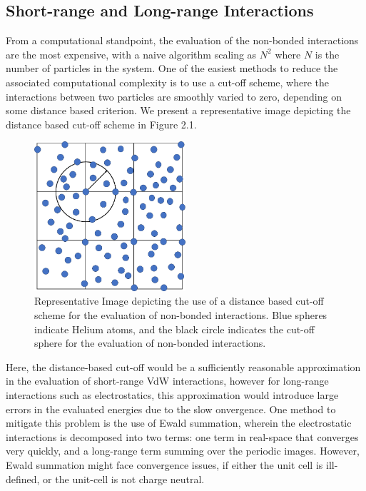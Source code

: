     \subsection{Short-range and Long-range Interactions}
    From a computational standpoint, the evaluation of the non-bonded interactions are the most expensive, with a naive algorithm scaling as $N^2$ where $N$ is the number of particles in the system. One of the easiest methods to reduce the associated computational complexity is to use a cut-off scheme, where the interactions between two particles are smoothly varied to zero, depending on some distance based criterion. We present a representative image depicting the distance based cut-off scheme in Figure 2.1. 
    \begin{figure}[!h]
        \centering
        \includegraphics[width=0.5\textwidth]{Methods/Figures/cutoff.png}
        \caption[Representative Image depicting the use of a distance based cut-off scheme for the evaluation of non-bonded interactions]{Representative Image depicting the use of a distance based cut-off scheme for the evaluation of non-bonded interactions. Blue spheres indicate Helium atoms, and the black circle indicates the cut-off sphere for the evaluation of non-bonded interactions.}
    \end{figure}
    
    Here, the distance-based cut-off would be a sufficiently reasonable approximation in the evaluation of short-range VdW interactions, however for long-range interactions such as electrostatics, this approximation would introduce large errors in the evaluated energies due to the slow onvergence. One method to mitigate this problem is the use of Ewald summation, wherein the electrostatic interactions is decomposed into two terms: one term in real-space that converges very quickly, and a long-range term summing over the periodic images. However, Ewald summation might face convergence issues, if either the unit cell is ill-defined, or the unit-cell is not charge neutral. 
    
